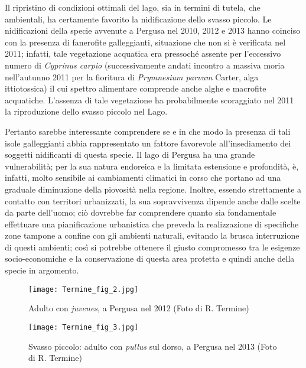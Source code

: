 {Il ripristino di condizioni ottimali del lago, sia in
termini di tutela, che ambientali, ha certamente favorito la
nidificazione dello svasso piccolo. Le nidificazioni della specie
avvenute a Pergusa nel 2010, 2012 e 2013 hanno coinciso con la presenza
di fanerofite galleggianti, situazione che non si \`e verificata nel
2011; infatti, tale vegetazione acquatica era pressoch\'e assente per
l{\textquoteright}eccessivo numero di
}\textit{{Cyprinus carpio}}{
(successivamente andati incontro a massiva moria
}nell{\textquoteright}autunno 2011 per la fioritura di
\textit{Prymnesium parvum }Carter, alga ittiotossica) il cui spettro
alimentare comprende anche alghe e macrofite acquatiche.
L{\textquoteright}assenza di tale vegetazione ha probabilmente
scoraggiato nel 2011 la riproduzione dello svasso piccolo nel Lago.

Pertanto sarebbe interessante comprendere se e in che modo la presenza
di tali isole galleggianti abbia rappresentato un fattore favorevole
all{\textquoteright}insediamento dei soggetti nidificanti di questa
specie. {Il lago di Pergusa ha una grande
vulnerabilit\`a; per la sua natura endoreica e la limitata estensione e
profondit\`a, \`e, infatti, molto sensibile ai cambiamenti climatici in
corso che portano ad una graduale diminuzione della piovosit\`a nella
regione. Inoltre, essendo strettamente a contatto con territori
urbanizzati, la sua sopravvivenza dipende anche dalle scelte da parte
dell{\textquoteright}uomo}; ci\`o dovrebbe far comprendere quanto sia
fondamentale effettuare una pianificazione urbanistica che preveda la
realizzazione di specifiche zone tampone a confine con gli ambienti
naturali, evitando la brusca interruzione di questi ambienti; cos\`i si
potrebbe ottenere il giusto compromesso tra le esigenze
socio-economiche e la conservazione di questa area protetta e quindi
anche della specie in argomento.

\begin{figure}[!h]
\centering
\texttt{[image: Termine\_fig\_2.jpg]}
\caption{Adulto con \textit{juvenes}, a Pergusa nel 2012 (Foto di R. Termine)}
\label{Termine_fig_2}
\end{figure}

\begin{figure}[!h]
\centering
\texttt{[image: Termine\_fig\_3.jpg]}
\caption{Svasso piccolo: adulto con \textit{pullus} sul dorso, a Pergusa nel 2013 (Foto di R. Termine)}
\label{Termine_fig_3}
\end{figure}

